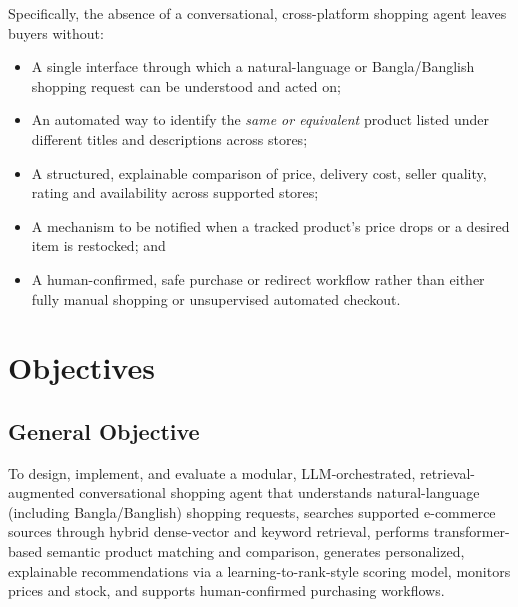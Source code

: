 \documentclass[12pt,a4paper]{article}
\begin{document}
Specifically, the absence of a conversational, cross-platform shopping agent leaves buyers without:
\begin{itemize}[leftmargin=1.3cm]
    \item A single interface through which a natural-language or Bangla/Banglish shopping request can be
    understood and acted on;
    \item An automated way to identify the \emph{same or equivalent} product listed under different titles and
    descriptions across stores;
    \item A structured, explainable comparison of price, delivery cost, seller quality, rating and availability
    across supported stores;
    \item A mechanism to be notified when a tracked product's price drops or a desired item is restocked; and
    \item A human-confirmed, safe purchase or redirect workflow rather than either fully manual shopping or
    unsupervised automated checkout.
\end{itemize}

\section{Objectives}

\subsection{General Objective}
To design, implement, and evaluate a modular, LLM-orchestrated, retrieval-augmented conversational shopping agent
that understands natural-language (including Bangla/Banglish) shopping requests, searches supported e-commerce
sources through hybrid dense-vector and keyword retrieval, performs transformer-based semantic product matching
and comparison, generates personalized, explainable recommendations via a learning-to-rank-style scoring model,
monitors prices and stock, and supports human-confirmed purchasing workflows.
\end{document}
